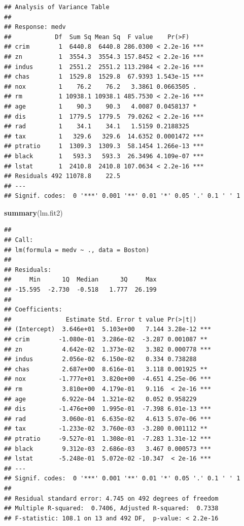 \documentclass[]{book}
\newenvironment{Shaded}{\begin{snugshade}}{\end{snugshade}}
\newcommand{\KeywordTok}[1]{\textcolor[rgb]{0.13,0.29,0.53}{\textbf{#1}}}
\newcommand{\NormalTok}[1]{#1}
\theoremstyle{definition}
\theoremstyle{definition}
\theoremstyle{definition}
\theoremstyle{remark}
\begin{document}
\begin{verbatim}
## Analysis of Variance Table
## 
## Response: medv
##            Df  Sum Sq Mean Sq  F value    Pr(>F)    
## crim        1  6440.8  6440.8 286.0300 < 2.2e-16 ***
## zn          1  3554.3  3554.3 157.8452 < 2.2e-16 ***
## indus       1  2551.2  2551.2 113.2984 < 2.2e-16 ***
## chas        1  1529.8  1529.8  67.9393 1.543e-15 ***
## nox         1    76.2    76.2   3.3861 0.0663505 .  
## rm          1 10938.1 10938.1 485.7530 < 2.2e-16 ***
## age         1    90.3    90.3   4.0087 0.0458137 *  
## dis         1  1779.5  1779.5  79.0262 < 2.2e-16 ***
## rad         1    34.1    34.1   1.5159 0.2188325    
## tax         1   329.6   329.6  14.6352 0.0001472 ***
## ptratio     1  1309.3  1309.3  58.1454 1.266e-13 ***
## black       1   593.3   593.3  26.3496 4.109e-07 ***
## lstat       1  2410.8  2410.8 107.0634 < 2.2e-16 ***
## Residuals 492 11078.8    22.5                       
## ---
## Signif. codes:  0 '***' 0.001 '**' 0.01 '*' 0.05 '.' 0.1 ' ' 1
\end{verbatim}

\begin{Shaded}
\begin{Highlighting}[]
\KeywordTok{summary}\NormalTok{(lm.fit2)}
\end{Highlighting}
\end{Shaded}

\begin{verbatim}
## 
## Call:
## lm(formula = medv ~ ., data = Boston)
## 
## Residuals:
##     Min      1Q  Median      3Q     Max 
## -15.595  -2.730  -0.518   1.777  26.199 
## 
## Coefficients:
##               Estimate Std. Error t value Pr(>|t|)    
## (Intercept)  3.646e+01  5.103e+00   7.144 3.28e-12 ***
## crim        -1.080e-01  3.286e-02  -3.287 0.001087 ** 
## zn           4.642e-02  1.373e-02   3.382 0.000778 ***
## indus        2.056e-02  6.150e-02   0.334 0.738288    
## chas         2.687e+00  8.616e-01   3.118 0.001925 ** 
## nox         -1.777e+01  3.820e+00  -4.651 4.25e-06 ***
## rm           3.810e+00  4.179e-01   9.116  < 2e-16 ***
## age          6.922e-04  1.321e-02   0.052 0.958229    
## dis         -1.476e+00  1.995e-01  -7.398 6.01e-13 ***
## rad          3.060e-01  6.635e-02   4.613 5.07e-06 ***
## tax         -1.233e-02  3.760e-03  -3.280 0.001112 ** 
## ptratio     -9.527e-01  1.308e-01  -7.283 1.31e-12 ***
## black        9.312e-03  2.686e-03   3.467 0.000573 ***
## lstat       -5.248e-01  5.072e-02 -10.347  < 2e-16 ***
## ---
## Signif. codes:  0 '***' 0.001 '**' 0.01 '*' 0.05 '.' 0.1 ' ' 1
## 
## Residual standard error: 4.745 on 492 degrees of freedom
## Multiple R-squared:  0.7406, Adjusted R-squared:  0.7338 
## F-statistic: 108.1 on 13 and 492 DF,  p-value: < 2.2e-16
\end{verbatim}
\end{document}
